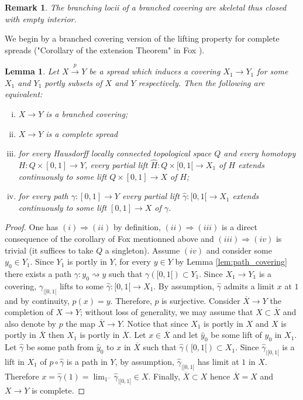\documentclass[a4paper,12pt]{article}
\newtheorem{lem}{Lemma}[section]          %
\newtheorem{rem}{Remark}             %
\begin{document}
 \begin{rem}\label{rem:branching_locii_branched_covering} The branching locii of a branched covering are skeletal thus closed with empty interior.
 \end{rem}

 We begin by a branched covering version of the lifting property for complete spreads ("Corollary of the extension Theorem" in Fox \cite{MR0123298}).
\begin{lem}\label{lem:complete_path_carac} 
 Let $X\xrightarrow{p} Y$ be a spread which induces a covering $X_1\rightarrow Y_1$ for some $X_1$ and $Y_1$ portly subsets of $X$ and $Y$ respectively. Then the following are equivalent:
 \begin{enumerate}[(i)]
  \item $X\rightarrow Y$ is a branched covering;
  \item $X\rightarrow Y$ is a complete spread
  \item for every Hausdorff locally connected topological space $Q$ and every homotopy $H:Q\times [0,1]\rightarrow Y$, every partial lift 
  $\hat H : Q \times [0,1[ \rightarrow X_1$ of $H$ extends continuously to some lift $Q \times [0,1] \rightarrow X$ of $H$;
  \item for every path $\gamma:[0,1]\rightarrow Y$ every partial lift 
  $\hat \gamma : [0,1[ \rightarrow X_1$ extends continuously to some lift $[0,1] \rightarrow X$ of $\gamma$.
  
 \end{enumerate}
\end{lem}
\begin{proof}
 One has $(i)\Rightarrow (ii)$ by definition, $(ii)\Rightarrow (iii)$ is a direct consequence of the corollary of Fox mentionned above and $(iii)\Rightarrow (iv)$ is trivial (it suffices to take $Q$ a singleton). 
 Assume $(iv)$ and consider some $y_0 \in Y_1$. Since $Y_1$ is portly in $Y$, for every $y\in Y$ by Lemma \ref{lem:path_covering} there exists a path $\gamma:y_0\rightsquigarrow y$ such that $\gamma([0,1[)\subset Y_1$. Since $X_1\rightarrow Y_1$ is a covering, $\gamma_{|[0,1[}$ lifts to some $\hat\gamma :[0,1[\rightarrow X_1$. By assumption, $\hat\gamma$ admits a limit $x$ at $1$ and by continuity, $p(x)=y$. Therefore, $p$ is surjective.  
 Consider $\overline X \rightarrow Y$ the completion of $X\rightarrow Y$; without loss of generality, we may assume that $X\subset \overline X$ and also denote by $p$ the map $\overline X\rightarrow Y$.   Notice that since $X_1$ is portly in $X$ and $X$ is portly in $\overline X$ then $X_1$ is portly in $\overline X$. Let $x \in \overline X$ and let $\hat y_0$ be some lift of $y_0$ in $X_1$. Let  $\hat \gamma$ be some path from $\hat y_0$ to $x$ in $\overline X$ such that $\hat\gamma([0,1[)\subset X_1$. Since $\hat\gamma_{|[0,1[}$ is a lift in $X_1$ of $p\circ \hat \gamma$ is a path in $Y$, by assumption, $\hat\gamma_{|[0,1[}$ has limit at $1$ in $X$. Therefore $x = \hat\gamma(1)= \lim_{1^-} \hat\gamma_{|[0,1[} \in X$. Finally, $\overline X\subset X$ hence $\overline X = X$ and $X\rightarrow Y$ is complete. 
\end{proof}
\end{document}

